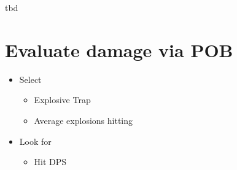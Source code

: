 tbd

\section{Evaluate damage via POB}
\begin{itemize}
	\item Select
	\begin{itemize}
		\item Explosive Trap
		\item Average explosions hitting
	\end{itemize}
	\item Look for
	\begin{itemize}
		\item Hit DPS
	\end{itemize}
\end{itemize}
